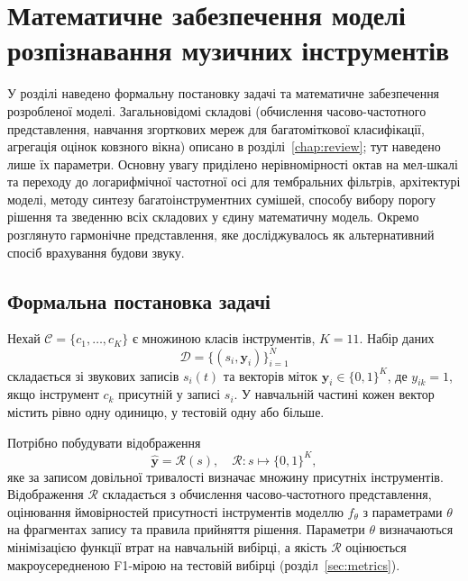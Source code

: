 
\chapter{Математичне забезпечення моделі розпізнавання музичних інструментів}
\label{chap:math}

У розділі наведено формальну постановку задачі та математичне забезпечення
розробленої моделі. Загальновідомі складові (обчислення
часово-частотного представлення, навчання згорткових мереж для
багатоміткової класифікації, агрегація оцінок ковзного вікна) описано в
розділі~\ref{chap:review}; тут наведено лише їх параметри. Основну увагу
приділено нерівномірності октав на мел-шкалі та переходу до логарифмічної
частотної осі для тембральних фільтрів, архітектурі моделі, методу синтезу
багатоінструментних сумішей, способу вибору порогу рішення та зведенню всіх складових у єдину математичну модель. Окремо
розглянуто гармонічне представлення, яке досліджувалось як альтернативний
спосіб врахування будови звуку.

\section{Формальна постановка задачі}
\label{sec:formal}

Нехай $\mathcal{C} = \{c_1, \ldots, c_K\}$ є множиною класів
інструментів, $K = 11$. Набір даних
\begin{equation}
    \mathcal{D} = \{(s_i, \mathbf{y}_i)\}_{i=1}^{N}
\end{equation}
складається зі звукових записів $s_i(t)$ та векторів міток
$\mathbf{y}_i \in \{0,1\}^K$, де $y_{ik} = 1$, якщо інструмент $c_k$
присутній у записі $s_i$. У навчальній частині кожен вектор містить рівно
одну одиницю, у тестовій одну або більше.

Потрібно побудувати відображення
\begin{equation}
    \hat{\mathbf{y}} = \mathcal{R}(s), \quad \mathcal{R}: s \mapsto \{0,1\}^K,
\end{equation}
яке за записом довільної тривалості визначає множину присутніх
інструментів. Відображення $\mathcal{R}$ складається з обчислення
часово-частотного представлення, оцінювання ймовірностей присутності
інструментів моделлю $f_\theta$ з параметрами $\theta$ на фрагментах
запису та правила прийняття рішення. Параметри $\theta$ визначаються
мінімізацією функції втрат на навчальній вибірці, а якість $\mathcal{R}$
оцінюється макроусередненою F1-мірою на тестовій вибірці
(розділ~\ref{sec:metrics}).

